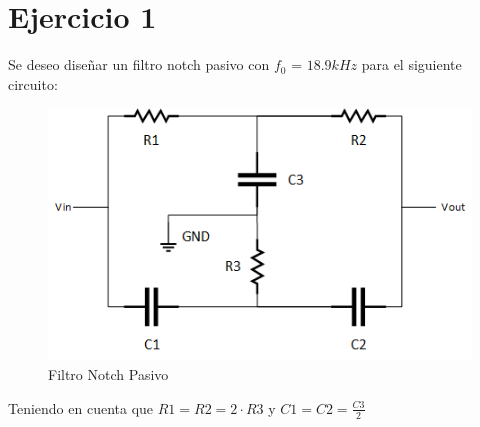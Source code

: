 \section{Ejercicio 1}

Se deseo diseñar un filtro notch pasivo con $f_0$ = $18.9 kHz$ para el siguiente circuito: 

\begin{figure}[h]
	\centering
	\includegraphics[scale=1]{../EJ1/circuito.png}
	\caption{Filtro Notch Pasivo}
	\label{ej1cir}
\end{figure}

Teniendo en cuenta que $R1 = R2 = 2\cdot R3$ y $C1 = C2 = \frac{C3}{2}$